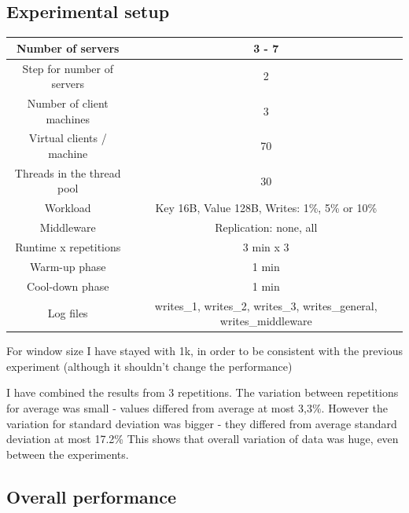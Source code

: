 \documentclass[11pt]{article}
\begin{document}
\subsection{Experimental setup}

{\small
\smallskip
\begin{tabular}{|c|c|}
\hline Number of servers & 3 - 7 \\ 
\hline Step for number of servers & 2 \\
\hline Number of client machines & 3 \\ 
\hline Virtual clients / machine &  70 \\ 
\hline Threads in the thread pool & 30 \\
\hline Workload & Key 16B, Value 128B, Writes: 1\%, 5\% or 10\% \\
\hline Middleware & Replication: none, all \\ 
\hline Runtime x repetitions & 3 min x 3 \\
\hline Warm-up phase & 1 min \\
\hline Cool-down phase & 1 min \\
\hline Log files & writes\_1, writes\_2, writes\_3, writes\_general, writes\_middleware \\
\hline 
\end{tabular} }
\medskip

For window size I have stayed with 1k, in order to be consistent with the previous experiment (although it shouldn't change the performance)

I have combined the results from 3 repetitions. The variation between repetitions for average was small - values differed from average at most 3,3\%. However the variation for standard deviation was bigger - they differed from average standard deviation at most 17.2\%  This shows that overall variation of data was huge, even between the experiments.

\subsection{Overall performance}
\end{document}
